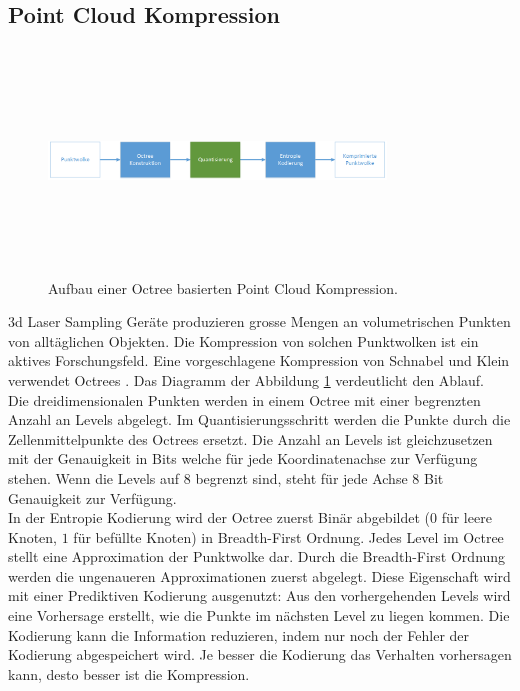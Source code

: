 \subsection{Point Cloud Kompression} \label{state:pointcloud}
\begin{figure}[!htbp]
	\center
	\includegraphics[width=0.8\textwidth,height=6cm,keepaspectratio]{./pictures/state/pointcloud.png}
	\caption{Aufbau einer Octree basierten Point Cloud Kompression.}
	\label{state:pointcloud:abb}
\end{figure}
3d Laser Sampling Geräte produzieren grosse Mengen an volumetrischen Punkten von alltäglichen Objekten. Die Kompression von solchen Punktwolken ist ein aktives Forschungsfeld. Eine vorgeschlagene Kompression  von Schnabel und Klein \cite{schnabel2006octree} verwendet Octrees \cite{wiki:octree}. Das Diagramm der Abbildung \ref{state:pointcloud:abb} verdeutlicht den Ablauf.\\
Die dreidimensionalen Punkten werden in einem Octree mit einer begrenzten Anzahl an Levels abgelegt. Im Quantisierungsschritt werden die Punkte durch die Zellenmittelpunkte des Octrees ersetzt. Die Anzahl an Levels ist gleichzusetzen mit der Genauigkeit in Bits welche für jede Koordinatenachse zur Verfügung stehen. Wenn die Levels auf $8$ begrenzt sind, steht für jede Achse $8$ Bit Genauigkeit zur Verfügung.\\
In der Entropie Kodierung wird der Octree zuerst Binär abgebildet ($0$ für leere Knoten, $1$ für befüllte Knoten) in Breadth-First Ordnung. Jedes Level im Octree stellt eine Approximation der Punktwolke dar. Durch die Breadth-First Ordnung werden die ungenaueren Approximationen zuerst abgelegt. Diese Eigenschaft wird mit einer Prediktiven Kodierung ausgenutzt: Aus den vorhergehenden Levels wird eine Vorhersage erstellt, wie die Punkte im nächsten Level zu liegen kommen. Die Kodierung kann die Information reduzieren, indem nur noch der Fehler der Kodierung abgespeichert wird. Je besser die Kodierung das Verhalten vorhersagen kann, desto besser ist die Kompression.

